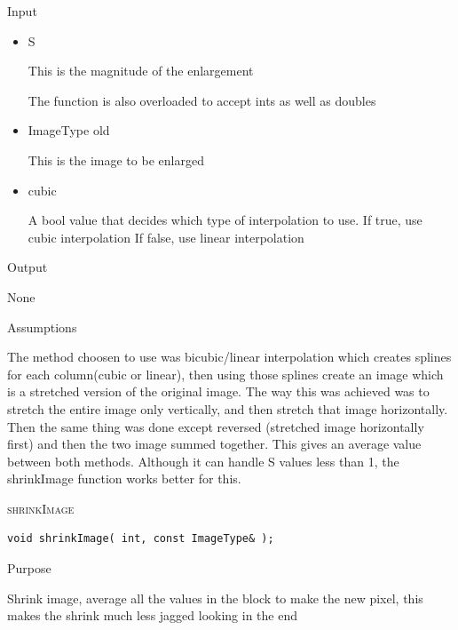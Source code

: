\documentclass[pdftex, 11pt]{article}
\begin{document}
\begin{description}
\begin{description}
			\item{Input}

				\begin{itemize}

					\item{S}

						This is the magnitude of the enlargement

						The function is also overloaded 
						to accept ints as well as doubles

					\item{ImageType old}

						This is the image to be enlarged

					\item{cubic}

						A bool value that decides which type of
						interpolation to use.
						If true, use cubic interpolation
						If false, use linear interpolation
				\end{itemize}

			\item{Output}

				None

			\item{Assumptions}


				The method choosen to use was bicubic/linear
				interpolation which creates
				splines for each column(cubic or linear),
				then using those splines create an
				image which is a stretched version of the original 
				image.  The way this was achieved
				was to stretch the entire image only vertically,
				and then stretch that
				image horizontally.  Then the same thing was done except
				reversed (stretched image
				horizontally first) and then the two image summed 
				together.  This gives an
				average value between both methods.  Although it can
				handle S values less
				than 1, the shrinkImage function works better for this.

		\end{description}

	\item{\textsc{shrinkImage}}
		\begin{description}

\begin{lstlisting}
void shrinkImage( int, const ImageType& );
\end{lstlisting}

			\item{Purpose}

				Shrink image, average all the values
				in the block to make the new pixel, this
				makes the shrink much less jagged looking in the end


\end{description}
\end{description}
\end{document}
